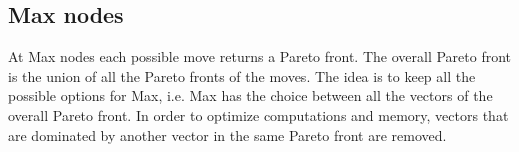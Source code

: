 \documentclass{ecai}
\begin{document}











\subsection{Max nodes}

At Max nodes each possible move returns a Pareto front. The overall
Pareto front is the union of all the Pareto fronts of the moves. The
idea is to keep all the possible options for Max, i.e. Max has the
choice between all the vectors of the overall Pareto front. In order
to optimize computations and memory, vectors that are dominated by
another vector in the same Pareto front are removed.
\end{document}
